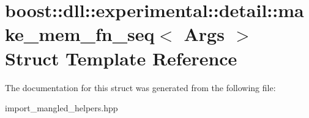 \hypertarget{a01480}{}\section{boost\+:\+:dll\+:\+:experimental\+:\+:detail\+:\+:make\+\_\+mem\+\_\+fn\+\_\+seq$<$ Args $>$ Struct Template Reference}
\label{a01480}


The documentation for this struct was generated from the following file\+:\begin{DoxyCompactItemize}
\item 
import\+\_\+mangled\+\_\+helpers.\+hpp\end{DoxyCompactItemize}
